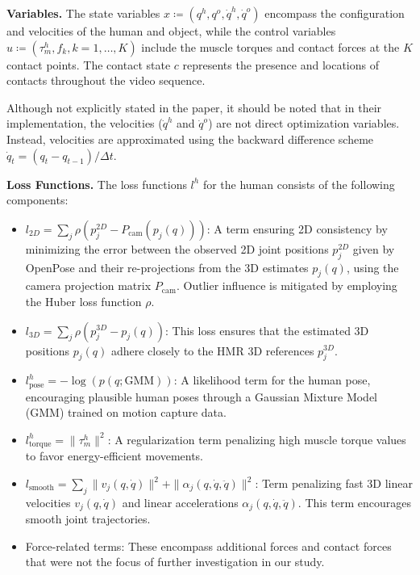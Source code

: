 \noindent\textbf{Variables.} The state variables \(x \coloneqq (q^h, q^o, \dot{q}^h, \dot{q}^o)\) encompass the configuration and velocities of 
the human and object, while the control variables \(u \coloneqq (\tau_m^h, f_k, k=1, \dots, K)\) include the muscle torques and contact forces 
at the \(K\) contact points. The contact state \(c\) represents the presence and locations of contacts throughout the video sequence. 


Although not explicitly stated in the paper, it should be noted that in their implementation, the velocities (\(\dot{q}^h\) and \(\dot{q}^o\))
are not direct optimization variables. Instead, velocities are approximated using the backward difference scheme 
\(\dot{q}_t = (q_t - q_{t - 1}) / \Delta t\).


\noindent\textbf{Loss Functions.} The loss functions \(l^h\) for the human consists of the following components:


\begin{itemize}
    \item 
        \(l_{2D} = \sum_j \rho\left(p_j^{2D} - P_{\text{cam}}\left(p_j(q)\right)\right)\): A term ensuring 2D consistency by minimizing the error 
        between the observed 2D joint positions \(p_j^{2D}\) given by OpenPose and 
        their re-projections from the 3D estimates \(p_j(q)\), using the camera projection matrix \(P_{\text{cam}}\). Outlier influence is mitigated 
        by employing the Huber loss function \(\rho\).
    \item 
        \(l_{3D} = \sum_j \rho\left(p_j^{3D} -p_j(q)\right)\): This loss ensures that the estimated 3D positions \(p_j(q)\) adhere closely to the
         HMR 3D references \(p_j^{3D}\).
    \item 
        \(l_{\text{pose}}^h = -\log\left(p\left(q;\text{GMM}\right)\right)\): A likelihood term for the human pose, encouraging plausible human 
        poses through a Gaussian Mixture Model (GMM) trained on motion capture data.
    \item
        \(l_{\text{torque}}^h = \|\tau_m^h\|^2\): A regularization term penalizing high muscle torque values to favor energy-efficient movements.
    \item 
        \(l_{\text{smooth}} = \sum_{j} \|v_j(q, \dot{q})\|^2 + \|\alpha_j(q, \dot{q}, \ddot{q})\|^2\): Term penalizing fast 3D linear velocities 
        \(v_j(q, \dot{q})\) and linear accelerations \(\alpha_j(q, \dot{q}, \ddot{q})\). This term encourages smooth joint trajectories.
    \item
        Force-related terms: These encompass additional forces and contact forces that were not the focus of further investigation in our 
        study.
\end{itemize}

